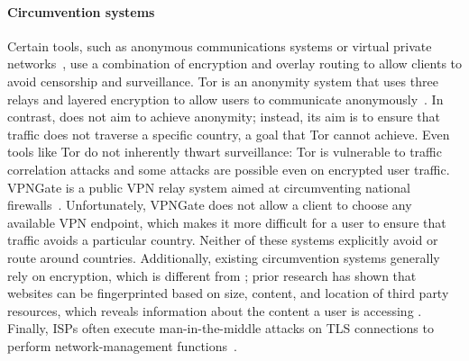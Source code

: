 \paragraph{Circumvention systems}  Certain tools, such as anonymous
communications systems or virtual private networks~\cite{dingledine2004tor,nobori2014vpn,piotrowska2017loopix,van2015vuvuzela,wolinsky2012dissent,tyagi2016stadium,corrigan2015riposte,kwon2016atom,kwon2016riffle,
gelernter2016two}, use a combination of
encryption and overlay routing to allow clients to avoid censorship and surveillance. Tor is
an anonymity system that uses three relays and layered encryption to allow
users to communicate anonymously~\cite{dingledine2004tor}.  In contrast,
\system{} does not aim to achieve anonymity; instead, its aim is to ensure
that traffic does not traverse a specific  country, a goal that Tor cannot
achieve.  Even tools like Tor do not inherently thwart surveillance: Tor is
vulnerable to traffic correlation attacks and some attacks are possible even
on encrypted user traffic. VPNGate is a public VPN relay system aimed at
circumventing national firewalls~\cite{nobori2014vpn}. Unfortunately, VPNGate
does not allow a client to choose any available VPN endpoint, which makes it more
difficult for a user to ensure that traffic avoids a particular country.  
Neither of these systems explicitly avoid or route around countries. Additionally, existing circumvention systems generally rely on
encryption, which is different from \system{}; prior research has shown that
websites can be fingerprinted based on size, content, and location of third
party resources, which  reveals information about the content a user is
accessing \cite{what_isps_can_see}.  Finally, ISPs often execute man-in-the-middle attacks on TLS connections to perform network-management
functions~\cite{mitm_isp}.

